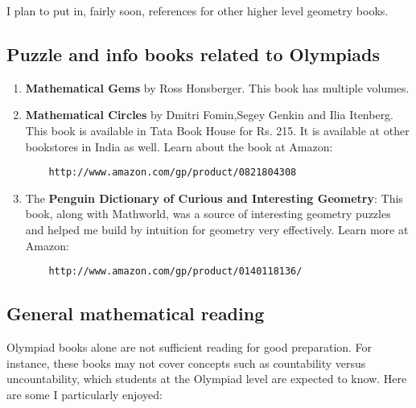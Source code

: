 \documentclass[a4paper]{amsart}
\begin{document}
I plan to put in, fairly soon, references for other higher level geometry books.

\subsection{Puzzle and info books related to Olympiads}

\begin{enumerate}

\item {\bf Mathematical Gems} by Ross Honsberger. This book has multiple volumes.

\item {\bf Mathematical Circles} by Dmitri Fomin,Segey Genkin and Ilia Itenberg. This book is available in Tata Book House
  for Rs. 215. It is available at other bookstores in India as well. Learn about the book at Amazon:
  
  \begin{verbatim}
    http://www.amazon.com/gp/product/0821804308
  \end{verbatim}


\item The {\bf Penguin Dictionary of Curious and Interesting Geometry}: This book, along with Mathworld, was a source of interesting
  geometry puzzles and helped me build by intuition for geometry very effectively. Learn more at Amazon:
  
  \begin{verbatim}
    http://www.amazon.com/gp/product/0140118136/
  \end{verbatim}


\end{enumerate}

\subsection{General mathematical reading}

Olympiad books alone are not sufficient reading for good preparation. For instance, these books may not cover 
concepts such as countability versus uncountability, which students at the Olympiad level are expected to know.
Here are some I particularly enjoyed:
\end{document}
